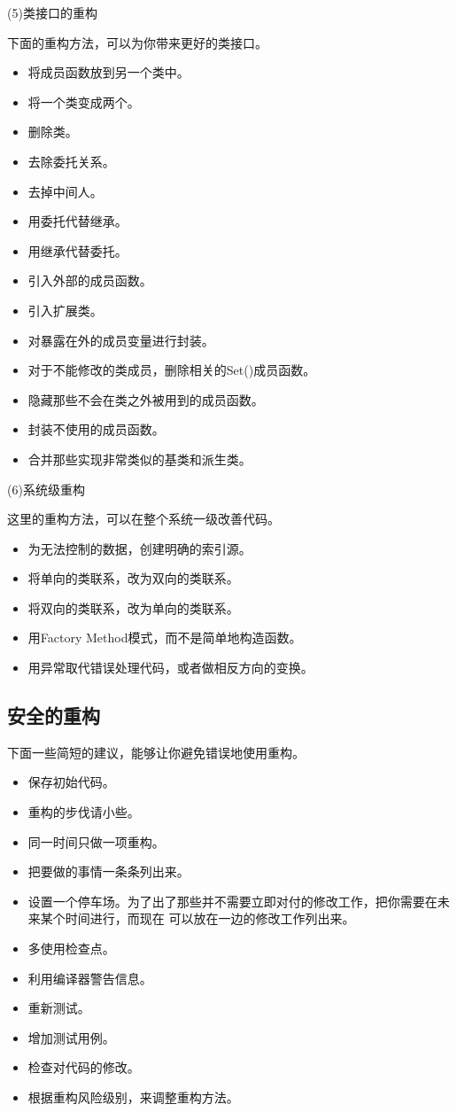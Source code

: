 \documentclass{article}
\begin{document}
\par
(5)类接口的重构
\par
下面的重构方法，可以为你带来更好的类接口。
\begin{itemize}
    \item 将成员函数放到另一个类中。
    \item 将一个类变成两个。
    \item 删除类。
    \item 去除委托关系。
    \item 去掉中间人。
    \item 用委托代替继承。
    \item 用继承代替委托。
    \item 引入外部的成员函数。
    \item 引入扩展类。
    \item 对暴露在外的成员变量进行封装。
    \item 对于不能修改的类成员，删除相关的Set()成员函数。
    \item 隐藏那些不会在类之外被用到的成员函数。
    \item 封装不使用的成员函数。
    \item 合并那些实现非常类似的基类和派生类。
\end{itemize}

\par
(6)系统级重构
\par
这里的重构方法，可以在整个系统一级改善代码。
\begin{itemize}
    \item 为无法控制的数据，创建明确的索引源。
    \item 将单向的类联系，改为双向的类联系。
    \item 将双向的类联系，改为单向的类联系。
    \item 用Factory Method模式，而不是简单地构造函数。
    \item 用异常取代错误处理代码，或者做相反方向的变换。
\end{itemize}

\subsection{安全的重构}
下面一些简短的建议，能够让你避免错误地使用重构。
\begin{itemize}
    \item 保存初始代码。
    \item 重构的步伐请小些。
    \item 同一时间只做一项重构。
    \item 把要做的事情一条条列出来。
    \item 设置一个停车场。为了出了那些并不需要立即对付的修改工作，把你需要在未来某个时间进行，而现在
    可以放在一边的修改工作列出来。
    \item 多使用检查点。
    \item 利用编译器警告信息。
    \item 重新测试。
    \item 增加测试用例。
    \item 检查对代码的修改。
    \item 根据重构风险级别，来调整重构方法。
\end{itemize}
\end{document}
